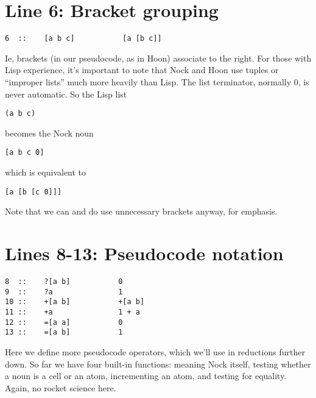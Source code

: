 \section{Line 6: Bracket grouping}

\begin{framed_shaded}
\begin{Verbatim}[fontsize=\relsize{-2.5},fontseries=b,commandchars=\\\{\}]
6  ::    [a b c]           [a [b c]]
\end{Verbatim}
\end{framed_shaded}
Ie, brackets (in our pseudocode, as in Hoon) associate to the right.  For those
with Lisp experience, it's important to note that Nock and Hoon use tuples or
``improper lists'' much more heavily than Lisp.  The list terminator, normally 0,
is never automatic.  So the Lisp list 

\begin{framed_shaded}
\begin{Verbatim}[fontsize=\relsize{-2.5},fontseries=b,commandchars=\\\{\}]
(a b c)
\end{Verbatim}
\end{framed_shaded}
becomes the Nock noun

\begin{framed_shaded}
\begin{Verbatim}[fontsize=\relsize{-2.5},fontseries=b,commandchars=\\\{\}]
[a b c 0]
\end{Verbatim}
\end{framed_shaded}
which is equivalent to

\begin{framed_shaded}
\begin{Verbatim}[fontsize=\relsize{-2.5},fontseries=b,commandchars=\\\{\}]
[a [b [c 0]]]
\end{Verbatim}
\end{framed_shaded}
Note that we can and do use unnecessary brackets anyway, for
emphasis.

\section{Lines 8-13: Pseudocode notation}

\begin{framed_shaded}
\begin{Verbatim}[fontsize=\relsize{-2.5},fontseries=b,commandchars=\\\{\}]
8  ::    ?[a b]           0
9  ::    ?a               1
10 ::    +[a b]           +[a b]
11 ::    +a               1 + a
12 ::    =[a a]           0
13 ::    =[a b]           1
\end{Verbatim}
\end{framed_shaded}
Here we define more pseudocode operators, which we'll use in reductions further
down.  So far we have four built-in functions: \kode{*} meaning Nock itself, 
testing whether a noun is a cell or an atom, \kode{+} incrementing an atom, and \kode{=}
testing for equality.  Again, no rocket science here.

